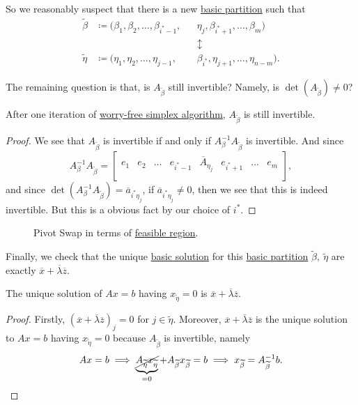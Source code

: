 So we reasonably suspect that there is a new \hyperref[def:basic-partition]{basic partition} such that
\[
	\begin{alignedat}{5}
		\widetilde{\beta} &\coloneqq ( \beta_1, \beta_2, \ldots , \beta_{i^{\ast}-1}, &&\eta_{j}, \beta_{i^{\ast}+1}, \ldots , \beta_m ) \\
		& &&\updownarrow\\
		\widetilde{\eta} &\coloneqq ( \eta_1, \eta_2, \ldots , \eta_{j - 1}, &&\beta_{i^{\ast}}, \eta_{j+1}, \ldots , \eta_{n-m} ).
	\end{alignedat}
\]

The remaining question is that, is \(A_{\widetilde{\beta}}\) still invertible? Namely, is \(\det (A_{\widetilde{\beta}}) \neq 0\)?
\begin{lemma}\label{lma:lec7-3}
	After one iteration of \hyperref[algo:worry-free-simplex-algorithm]{worry-free simplex algorithm}, \(A_{\widetilde{\beta}}\) is still invertible.
\end{lemma}
\begin{proof}
	We see that \(A_{\widetilde{\beta}}\) is invertible if and only if \(A^{-1}_{\beta}A_{\widetilde{\beta}}\) is invertible. And since
	\[
		A^{-1}_{\beta}A_{\widetilde{\beta}} = \begin{bmatrix}
			e_1 & e_2 & \ldots & e_{i^{\ast}-1} & \overline{A}_{\eta_{j}} & e_{i^{\ast}+1} & \ldots & e_m \\
		\end{bmatrix},
	\]
	and since \(\det(A^{-1}_\beta A_{\widetilde{\beta}}) = \overline{a}_{i^{\ast} \eta_{j}}\), if \(\overline{a}_{i^{\ast} \eta_{j}}\neq 0\), then we see that this is indeed invertible. But this is
	a obvious fact by our choice of \(i^{\ast}\).
\end{proof}

\begin{figure}[H]
	\centering
	\caption{Pivot Swap in terms of \hyperref[def:feasible-region]{feasible region}.}
	\label{fig:pivot-swap}
\end{figure}

Finally, we check that the unique \hyperref[def:basic-solution]{basic solution} for this \hyperref[def:basic-partition]{basic partition}
\(\widetilde{\beta},\ \widetilde{\eta}\) are exactly \(\overline{x} + \overline{\lambda}\overline{z}\).
\begin{lemma}\label{lma:lec7-4}
	The unique solution of \(Ax = b\) having \(x_{\widetilde{\eta}} = 0\) is \(\overline{x} + \overline{\lambda}\overline{z}\).
\end{lemma}
\begin{proof}
	Firstly, \((\overline{x} + \overline{\lambda}\overline{z})_j = 0\) for \(j\in \widetilde{\eta}\). Moreover, \(\overline{x} + \overline{\lambda}\overline{z}\) is
	the unique solution to \(Ax = b\) having \(x_{\widetilde{\eta}} = 0\) because \(A_{\widetilde{\beta}}\) is invertible, namely
	\[
		Ax = b \implies \underbrace{\cancel{A_{\widetilde{\eta}}x_{\widetilde{\eta}}}}_{=0} + A_{\widetilde{\beta}}x_{\widetilde{\beta}} = b \implies x_{\widetilde{\beta}} = A^{-1}_{\widetilde{\beta}}b.
	\]
\end{proof}